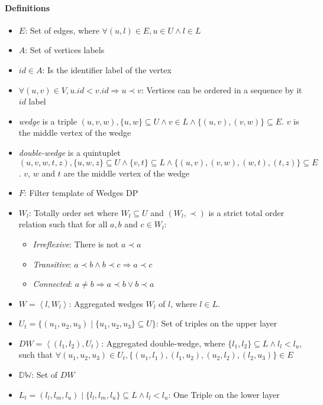 \documentclass[12pt, a4paper]{article}
\newcommand{\dw}{\mathbb{DW}}
\newcommand{\la}{\left\langle}
\newcommand{\ra}{\right\rangle}
\begin{document}
\paragraph{Definitions}
\begin{itemize}
      \item $E$: Set of edges, where $\forall (u,l) \in E, u \in U \land l \in L$
      \item $A$: Set of vertices labels
      \item $id \in A$: Is the identifier label of the vertex
      \item $\forall (u,v) \in V, u.id < v.id \Rightarrow u \prec v$: Vertices can be ordered in a sequence by it $id$ label
      \item \textit{wedge} is a triple $(u,v,w), \{u,w\} \subseteq U  \land v \in L \land \{(u,v), (v,w)\} \subseteq E$. $v$ is the middle vertex of the wedge
      \item \textit{double-wedge} is a quintuplet $(u,v,w,t,z), \{u,w,z\} \subseteq U  \land \{v,t\} \subseteq L \land \{(u,v), (v,w), (w, t), (t,z)\} \subseteq E$. 
            $v$, $w$ and $t$ are the middle vertex of the wedge
      \item $F$: Filter template of Wedges DP
      \item $W_l$: Totally order set where $W_l \subseteq U$ and $(W_l, \prec)$ is a strict total order relation such that for all $a, b$ and $c \in W_l$:
      \begin{itemize}
            \item \textit{Irreflexive}: There is not $a \prec a$ 
            \item \textit{Transitive}: $a \prec b \land b \prec c \Rightarrow a \prec c$ 
            \item \textit{Connected}: $a \neq b \Rightarrow a \prec b \lor b \prec a$ 
      \end{itemize}
      \item $W = \la l, W_l \ra$: Aggregated wedges $W_l$ of $l$, where $l \in L$.
      \item $U_t = \{(u_1, u_2, u_3) \mid \{u_1, u_2, u_3\} \subseteq U\}$: Set of triples on the upper layer
      \item $DW = \la (l_1, l_2), U_t \ra$: Aggregated double-wedge, where $\{l_1, l_2\} \subseteq L \land l_l < l_u$, such that $\forall (u_1, u_2, u_3) \in U_t, \{(u_1, l_1), (l_1, u_2), (u_2, l_2), (l_2, u_3)\} \in E$
      \item $\dw$: Set of $DW$
      \item $L_t = (l_l, l_m, l_u) \mid \{l_l, l_m, l_u\} \subseteq L \land l_l < l_u$: One Triple on the lower layer

\end{itemize}
\end{document}
